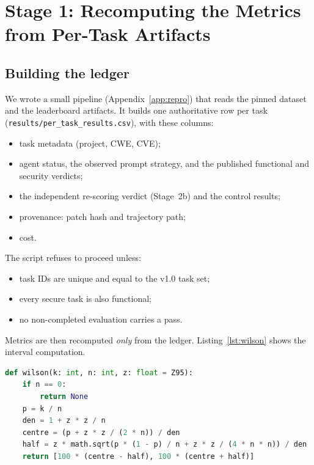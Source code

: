 \documentclass[11pt,a4paper]{article}
\begin{document}
\section{Stage 1: Recomputing the Metrics from Per-Task Artifacts}
\subsection{Building the ledger}
We wrote a small pipeline (Appendix~\ref{app:repro}) that reads the pinned dataset and the leaderboard artifacts.
It builds one authoritative row per task (\texttt{results/per\_task\_results.csv}), with these columns:
\begin{itemize}[nosep]
  \item task metadata (project, CWE, CVE);
  \item agent status, the observed prompt strategy, and the published functional and security verdicts;
  \item the independent re-scoring verdict (Stage~2b) and the control results;
  \item provenance: patch hash and trajectory path;
  \item cost.
\end{itemize}
The script refuses to proceed unless:
\begin{itemize}[nosep]
  \item task IDs are unique and equal to the v1.0 task set;
  \item every secure task is also functional;
  \item no non-completed evaluation carries a pass.
\end{itemize}
Metrics are then recomputed \emph{only} from the ledger. Listing~\ref{lst:wilson} shows the interval computation.

\begin{lstlisting}[language=Python,caption={[Wilson score interval]Wilson score interval used for all confidence intervals (\texttt{scripts/recompute\_metrics.py}).},label={lst:wilson}]
def wilson(k: int, n: int, z: float = Z95):
    if n == 0:
        return None
    p = k / n
    den = 1 + z * z / n
    centre = (p + z * z / (2 * n)) / den
    half = z * math.sqrt(p * (1 - p) / n + z * z / (4 * n * n)) / den
    return [100 * (centre - half), 100 * (centre + half)]
\end{lstlisting}
\end{document}
